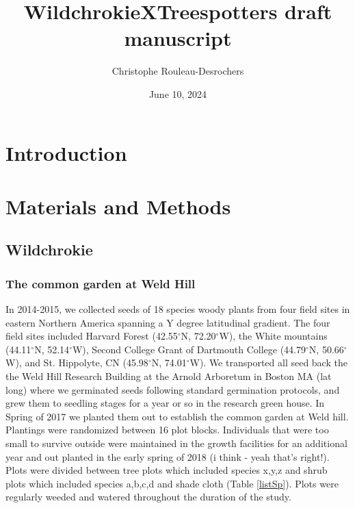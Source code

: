 \documentclass{article}
\title{WildchrokieXTreespotters draft manuscript}
\author[1*$\dag$]{Christophe Rouleau-Desrochers}
\affil[1]{UBC}
\date{June 10, 2024}
\begin{document}
\maketitle

\begin{abstract}
\end{abstract}

\section{Introduction}

\section{Materials and Methods}
\subsection{Wildchrokie}
\subsubsection{The common garden at Weld Hill}
In 2014-2015, we collected seeds of 18 species woody plants from four field sites in eastern Northern America spanning a Y degree latitudinal gradient. The four field sites included Harvard Forest (42.55$^{\circ}$N, 72.20$^{\circ}$W), the White mountains (44.11$^{\circ}$N, 52.14$^{\circ}$W), Second College Grant of Dartmouth College (44.79$^{\circ}$N, 50.66$^{\circ}$W), and St. Hippolyte, CN (45.98$^{\circ}$N, 74.01$^{\circ}$W). We transported all seed back the the Weld Hill Research Building at the Arnold Arboretum in Boston MA (lat long) where we germinated seeds following standard germination protocols, and grew them to seedling stages for a year or so in the research green house. In Spring of 2017 we planted them out to establish the common garden at Weld hill. Plantings were randomized between 16 plot blocks. Individuals that were too small to survive outside were maintained in the growth facilities for an additional year and out planted in the early spring of 2018 (i think - yeah that's right!). Plots were divided between tree plots which included species x,y,z and shrub plots which included species a,b,c,d and shade cloth (Table \ref{listSp}). Plots were regularly weeded and watered throughout the duration of the study.
\end{document}
